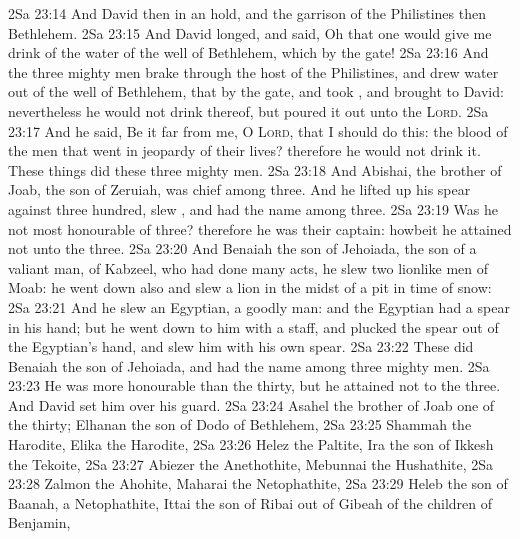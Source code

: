 \vs 2Sa 23:14 And David  then in an hold, and the garrison of the Philistines  then  Bethlehem.
\vs 2Sa 23:15 And David longed, and said, Oh that one would give me drink of the water of the well of Bethlehem, which  by the gate!
\vs 2Sa 23:16 And the three mighty men brake through the host of the Philistines, and drew water out of the well of Bethlehem, that  by the gate, and took , and brought  to David: nevertheless he would not drink thereof, but poured it out unto the \textsc{Lord}.
\vs 2Sa 23:17 And he said, Be it far from me, O \textsc{Lord}, that I should do this:  the blood of the men that went in jeopardy of their lives? therefore he would not drink it. These things did these three mighty men.
\vs 2Sa 23:18 And Abishai, the brother of Joab, the son of Zeruiah, was chief among three. And he lifted up his spear against three hundred,  slew , and had the name among three.
\vs 2Sa 23:19 Was he not most honourable of three? therefore he was their captain: howbeit he attained not unto the  three.
\vs 2Sa 23:20 And Benaiah the son of Jehoiada, the son of a valiant man, of Kabzeel, who had done many acts, he slew two lionlike men of Moab: he went down also and slew a lion in the midst of a pit in time of snow:
\vs 2Sa 23:21 And he slew an Egyptian, a goodly man: and the Egyptian had a spear in his hand; but he went down to him with a staff, and plucked the spear out of the Egyptian's hand, and slew him with his own spear.
\vs 2Sa 23:22 These  did Benaiah the son of Jehoiada, and had the name among three mighty men.
\vs 2Sa 23:23 He was more honourable than the thirty, but he attained not to the  three. And David set him over his guard.
\vs 2Sa 23:24 Asahel the brother of Joab  one of the thirty; Elhanan the son of Dodo of Bethlehem,
\vs 2Sa 23:25 Shammah the Harodite, Elika the Harodite,
\vs 2Sa 23:26 Helez the Paltite, Ira the son of Ikkesh the Tekoite,
\vs 2Sa 23:27 Abiezer the Anethothite, Mebunnai the Hushathite,
\vs 2Sa 23:28 Zalmon the Ahohite, Maharai the Netophathite,
\vs 2Sa 23:29 Heleb the son of Baanah, a Netophathite, Ittai the son of Ribai out of Gibeah of the children of Benjamin,
